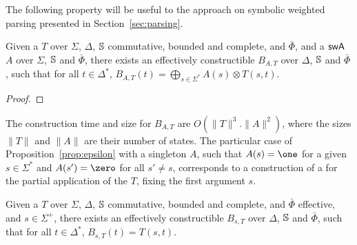 


\noindent
The following property will be useful to the approach on
symbolic weighted parsing presented in Section~\ref{sec:parsing}.

\begin{proposition} \label{prop:epsilon}
Given a \SWT $T$ over $\Sigma$, $\Delta$,
$\mathbb{S}$ commutative, bounded and complete,
and $\bar\Phi$, %
and a $\textsf{swA}$ $A$ over $\Sigma$, $\mathbb{S}$ and $\bar\Phi$,
there exists an effectively constructible \SWA
$B_{A, T}$ over $\Delta$, $\mathbb{S}$ and $\bar\Phi$,
such that for all $t \in \Delta^*$,
$B_{A, T}(t) = \displaystyle\bigoplus_{s\in \Sigma^*} A(s) \otimes T(s, t)$.
\end{proposition}
%
\begin{proof}

\end{proof}

\noindent
The construction time and size for $B_{A, T}$ are $O(\| T \|^3 . \| A \|^2)$,
where the sizes $\| T \|$ and $\| A \|$ are their number of states.
%
The particular case of Proposition~\ref{prop:epsilon} with a singleton $A$,
\ie such that $A(s) = \one$ for a given $s \in \Sigma^*$ 
and $A(s') = \zero$ for all $s' \neq s$,
corresponds to a construction of a \SWA for the partial application of the \SWT $T$,
fixing the first argument $s$.
\begin{corollary} \label{cor:epsilon}
Given a \SWT $T$ over $\Sigma$, $\Delta$,
$\mathbb{S}$ commutative, bounded and complete,
and $\bar\Phi$ effective,
and $s \in \Sigma^+$,
there exists an effectively constructible \SWA
$B_{s, T}$ over $\Delta$, $\mathbb{S}$ and $\bar\Phi$,
such that for all $t \in \Delta^*$, $B_{s, T}(t) = T(s, t)$.
\end{corollary}









